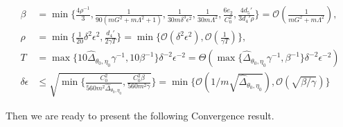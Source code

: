 \documentclass[twoside]{article} %
\theoremstyle{plain}
\theoremstyle{definition}
\theoremstyle{remark}
\begin{document}
\begin{align}
        \beta &= \min\Big\{{ \frac{4\rho^{-1}}{3},\frac{1}{90(mG^2+m\Lambda^2+1)},\frac{1}{30m\delta^3\epsilon^2},\frac{1}{30m\Lambda^2}},\frac{6e_2}{C_0^2},{\frac{4d_5'}{3d_4'\rho}}\Big\}=\mathcal{O}(\frac{1}{mG^2+m\Lambda^2}),\nonumber\\
        \rho &= \min\Big\{{\frac{1}{20}\delta^2\epsilon^2,{\frac{d_4'}{2\gamma T}}}\Big\}=\min\{\mathcal{O}(\delta^2\epsilon^2),\mathcal{O}(\frac{1}{\gamma T})\},\nonumber\\
        T&= {\max \Big\{ {10\hat{\Delta}_{\theta_0,\eta_0}\gamma^{-1}, 10\beta^{-1}} \Big\}}\delta^{-2}\epsilon^{-2}=\Theta(\max\{\hat{\Delta}_{\theta_0,\eta_0}\gamma^{-1},\beta^{-1}\}\delta^{-2}\epsilon^{-2})\nonumber\\
        \delta\epsilon&\leq \sqrt{\min\{\frac{C_0^2}{560m^2\hat{\Delta}_{\theta_0,\eta_0}},\frac{C_0^2\beta}{560m^2\gamma}}\}=\min\{\mathcal{O}({1}/{m\sqrt{\hat{\Delta}_{\theta_0,\eta_0}}}),\mathcal{O}(\sqrt{{\beta}/{\gamma}})\}
\end{align}

Then we are ready to present the following Convergence result.
\end{document}
